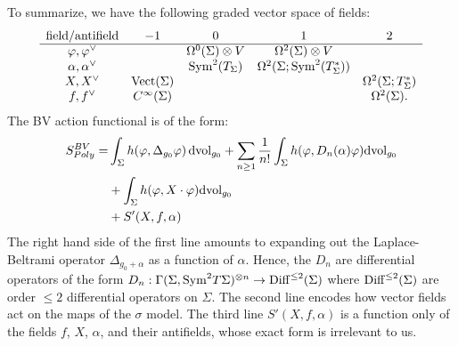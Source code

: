To summarize, we have the following graded vector space of fields:
\[
\begin{array}{ccccc}
\text{field/antifield} & -1 &0 & 1 & 2\\
\hline
\varphi, \varphi^\vee & & \Omega^{0}(\Sigma) \otimes V & \Omega^2(\Sigma) \otimes V & \\
\alpha, \alpha^\vee & & {\rm Sym}^2(T_\Sigma) & \Omega^2(\Sigma ; {\rm Sym}^{2}(T^*_\Sigma)) & \\
X, X^\vee & {\rm Vect}(\Sigma) & & & \Omega^2(\Sigma ; T^*_\Sigma)\\
f, f^\vee & C^\infty(\Sigma) &&& \Omega^2(\Sigma) .
\end{array}
\]
The BV action functional is of the form:
\begin{align}\label{polyakov bv}
S^{BV}_{Poly} = 
& \int_\Sigma h(\varphi, \Delta_{g_0} \varphi)\, {\rm dvol}_{g_0} + \sum_{n \geq 1} \frac{1}{n!} \int_{\Sigma} h(\varphi, D_n(\alpha) \varphi) {\rm dvol}_{g_0} \\
& +  \int_{\Sigma} h(\varphi, X \cdot \varphi) {\rm dvol}_{g_0} \\
& +  S'(X, f, \alpha) 
\end{align}
The right hand side of the first line amounts to expanding out the Laplace-Beltrami operator $\Delta_{g_0 + \alpha}$ as a function of $\alpha$.
Hence, the $D_n$ are differential operators of the form 
$D_n : \Gamma(\Sigma , {\rm Sym}^2 T\Sigma)^{\otimes n} \to {\rm Diff}^{\leq 2} (\Sigma)$ 
where ${\rm Diff}^{\leq 2}(\Sigma)$ are order $\leq 2$ differential operators on $\Sigma$.
The second line encodes how vector fields act on the maps of the $\sigma$ model.
The third line $S'(X, f, \alpha)$ is a function only of the fields $f$, $X$, $\alpha$, and their antifields,
whose exact form is irrelevant to us. 

